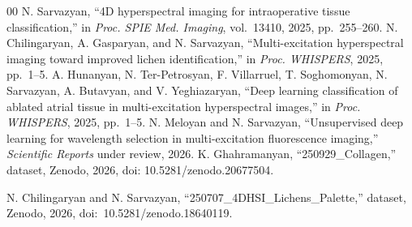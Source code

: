 \documentclass{article}
\begin{document}
\begin{thebibliography}{00}
N. Sarvazyan, ``4D hyperspectral imaging for intraoperative tissue classification,'' in
\emph{Proc. SPIE Med. Imaging}, vol.~13410, 2025, pp.~255--260.
 N. Chilingaryan, A. Gasparyan, and N. Sarvazyan, ``Multi-excitation
hyperspectral imaging toward improved lichen identification,'' in \emph{Proc. WHISPERS}, 2025, pp.~1--5.
 A. Hunanyan, N. Ter-Petrosyan, F. Villarruel, T. Soghomonyan,
N. Sarvazyan, A. Butavyan, and V. Yeghiazaryan, ``Deep learning classification of ablated
atrial tissue in multi-excitation hyperspectral images,'' in \emph{Proc. WHISPERS}, 2025, pp.~1--5.
 N. Meloyan and N. Sarvazyan, ``Unsupervised deep learning for
wavelength selection in multi-excitation fluorescence imaging,'' \emph{Scientific Reports}
under review, 2026.
 K. Ghahramanyan, ``250929\_Collagen,'' dataset, Zenodo, 2026, doi: 10.5281/zenodo.20677504.
 \raggedright N. Chilingaryan and N. Sarvazyan, ``250707\_\allowbreak 4DHSI\_\allowbreak Lichens\_\allowbreak Palette,'' dataset, Zenodo, 2026, doi:~10.5281/\allowbreak zenodo.18640119.
\end{thebibliography}
\end{document}

